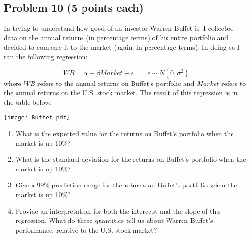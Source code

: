 \documentclass[12pt]{article}
\begin{document}
\newpage


\subsection*{Problem 10 (5 points each)}

\vspace{0.5cm}

In trying to understand how good of an investor Warren Buffet is, I collected data on the annual returns (in percentage terms) of his entire portfolio and decided to compare it to the market (again, in percentage terms). In doing so I ran the following regression:

$$
WB = \alpha + \beta Market + \epsilon  \quad \quad  \epsilon \sim N(0,\sigma^2)
$$
where $WB$ refers to the annual returns on Buffet's portfolio and $Market$ refers to the annual returns on the U.S. stock market. The result of this regression is in the table below:

\vspace{0.5cm}
\texttt{[image: Buffet.pdf]}

\vspace{0.5cm}
\begin{enumerate}
\item What is the expected value for the returns on Buffet's portfolio when the market is up 10\%?
\vspace{5cm}

\newpage
\item What is the standard deviation for the returns on Buffet's portfolio when the market is up 10\%?
\vspace{5cm}

\item Give a 99\% prediction range for the returns on Buffet's portfolio when the market is up 10\%?
\vspace{5cm}

\item Provide an interpretation for both the intercept and the slope of this regression. What do these quantities tell us about Warren Buffet's performance, relative to the U.S. stock market? 

\end{enumerate}
\end{document}
